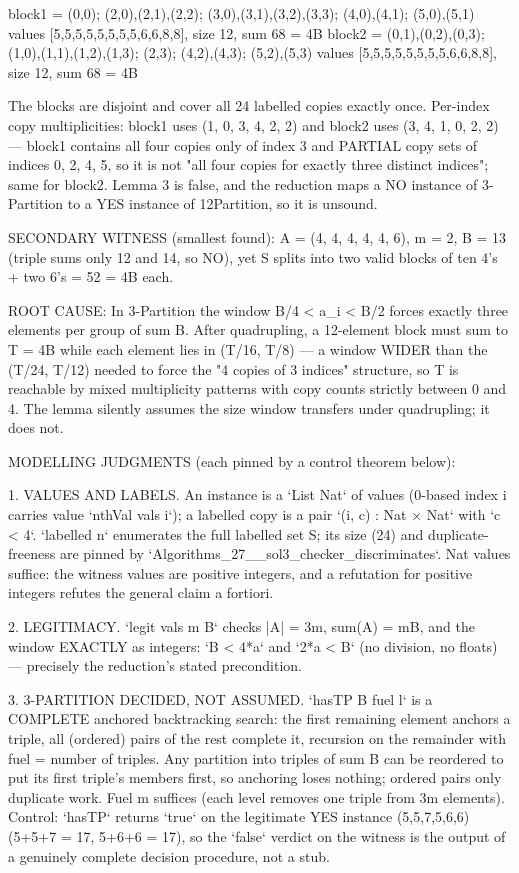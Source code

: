 \documentclass[11pt]{article}
\begin{document}
\begin{Vlean}
      block1 = (0,0); (2,0),(2,1),(2,2); (3,0),(3,1),(3,2),(3,3);
               (4,0),(4,1); (5,0),(5,1)
               values [5,5,5,5,5,5,5,5,6,6,8,8], size 12, sum 68 = 4B
      block2 = (0,1),(0,2),(0,3); (1,0),(1,1),(1,2),(1,3); (2,3);
               (4,2),(4,3); (5,2),(5,3)
               values [5,5,5,5,5,5,5,5,6,6,8,8], size 12, sum 68 = 4B

    The blocks are disjoint and cover all 24 labelled copies exactly once.
    Per-index copy multiplicities: block1 uses (1, 0, 3, 4, 2, 2) and
    block2 uses (3, 4, 1, 0, 2, 2) — block1 contains all four copies only
    of index 3 and PARTIAL copy sets of indices 0, 2, 4, 5, so it is not
    "all four copies for exactly three distinct indices"; same for block2.
    Lemma 3 is false, and the reduction maps a NO instance of 3-Partition
    to a YES instance of 12Partition, so it is unsound.

SECONDARY WITNESS (smallest found): A = (4, 4, 4, 4, 4, 6), m = 2, B = 13
(triple sums only 12 and 14, so NO), yet S splits into two valid blocks of
ten 4's + two 6's = 52 = 4B each.

ROOT CAUSE:  In 3-Partition the window B/4 < a_i < B/2 forces exactly three
elements per group of sum B.  After quadrupling, a 12-element block must sum
to T = 4B while each element lies in (T/16, T/8) — a window WIDER than the
(T/24, T/12) needed to force the "4 copies of 3 indices" structure, so T is
reachable by mixed multiplicity patterns with copy counts strictly between
0 and 4.  The lemma silently assumes the size window transfers under
quadrupling; it does not.

MODELLING JUDGMENTS (each pinned by a control theorem below):

 1. VALUES AND LABELS.  An instance is a `List Nat` of values (0-based
    index i carries value `nthVal vals i`); a labelled copy is a pair
    `(i, c) : Nat × Nat` with `c < 4`.  `labelled n` enumerates the full
    labelled set S; its size (24) and duplicate-freeness are pinned by
    `Algorithms_27__sol3_checker_discriminates`.  Nat values suffice: the
    witness values are positive integers, and a refutation for positive
    integers refutes the general claim a fortiori.

 2. LEGITIMACY.  `legit vals m B` checks |A| = 3m, sum(A) = mB, and the
    window EXACTLY as integers: `B < 4*a` and `2*a < B` (no division, no
    floats) — precisely the reduction's stated precondition.

 3. 3-PARTITION DECIDED, NOT ASSUMED.  `hasTP B fuel l` is a COMPLETE
    anchored backtracking search: the first remaining element anchors a
    triple, all (ordered) pairs of the rest complete it, recursion on the
    remainder with fuel = number of triples.  Any partition into triples of
    sum B can be reordered to put its first triple's members first, so
    anchoring loses nothing; ordered pairs only duplicate work.  Fuel m
    suffices (each level removes one triple from 3m elements).  Control:
    `hasTP` returns `true` on the legitimate YES instance (5,5,7,5,6,6)
    (5+5+7 = 17, 5+6+6 = 17), so the `false` verdict on the witness is the
    output of a genuinely complete decision procedure, not a stub.


\end{Vlean}
\end{document}

